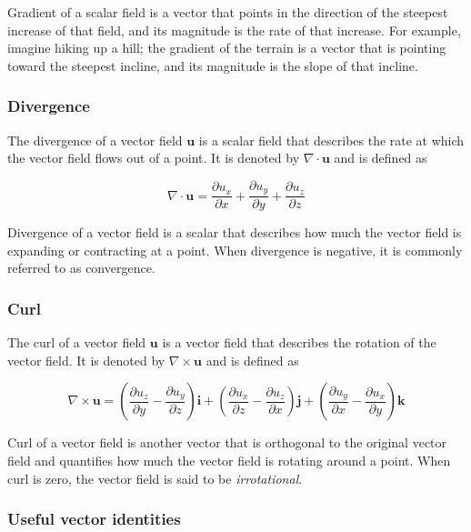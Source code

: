 \documentclass[12pt]{article}
\numberwithin{equation}{section}
\numberwithin{figure}{section}
\numberwithin{table}{section}
\begin{document}
Gradient of a scalar field is a vector that points in the direction of the
steepest increase of that field, and its magnitude is the rate of that increase.
For example, imagine hiking up a hill; the gradient of the terrain is a vector
that is pointing toward the steepest incline, and its magnitude is the slope
of that incline.

\subsubsection{Divergence}

The divergence of a vector field $\mathbf{u}$ is a scalar field that describes
the rate at which the vector field flows out of a point.
It is denoted by $\nabla \cdot \mathbf{u}$ and is defined as

\begin{equation}
  \label{eq:divergence}
  \nabla \cdot \mathbf{u} = \frac{\partial u_x}{\partial x} +
    \frac{\partial u_y}{\partial y} + \frac{\partial u_z}{\partial z}
\end{equation}

Divergence of a vector field is a scalar that describes how much the vector
field is expanding or contracting at a point.
When divergence is negative, it is commonly referred to as convergence.

\subsubsection{Curl}

The curl of a vector field $\mathbf{u}$ is a vector field that describes the
rotation of the vector field.
It is denoted by $\nabla \times \mathbf{u}$ and is defined as

\begin{equation}
  \nabla \times \mathbf{u} = \left( \frac{\partial u_z}{\partial y} -
    \frac{\partial u_y}{\partial z} \right) \mathbf{i} +
    \left( \frac{\partial u_x}{\partial z} -
    \frac{\partial u_z}{\partial x} \right) \mathbf{j} +
    \left( \frac{\partial u_y}{\partial x} -
    \frac{\partial u_x}{\partial y} \right) \mathbf{k}
\end{equation}

Curl of a vector field is another vector that is orthogonal to the original
vector field and quantifies how much the vector field is rotating around a
point.
When curl is zero, the vector field is said to be \textit{irrotational}.

\subsubsection{Useful vector identities}
\end{document}
